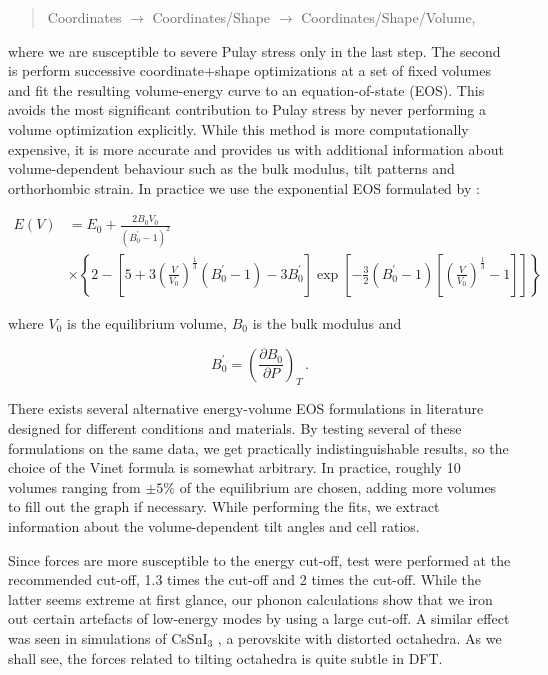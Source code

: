 \begin{quote}
	Coordinates $\rightarrow$ Coordinates/Shape $\rightarrow$ Coordinates/Shape/Volume, 
\end{quote}

\noindent where we are susceptible to severe Pulay stress only in the last step. The second is perform successive coordinate+shape optimizations at a set of fixed volumes and fit the resulting volume-energy curve to an equation-of-state (EOS). This avoids the most significant contribution to Pulay stress by never performing a volume optimization explicitly. While this method is more computationally expensive, it is more accurate and provides us with additional information about volume-dependent behaviour such as the bulk modulus, tilt patterns and orthorhombic strain. In practice we use the exponential EOS formulated by \citeauthor{Vinet1987} \cite{Vinet1987}:

\begin{align*}
E(V) &= E_0 + \frac{2B_0V_0}{\left(B_0^\prime-1\right)^2} \\
&\times \left\lbrace 2 -\left[ 5 + 3\left( \frac{V}{V_0}\right)^\frac{1}{3} (B_0^\prime -1)  -3B_0^\prime \right] \right. \left. \exp \left[ -\frac{3}{2} \left( B_0^\prime-1\right)\left[\left( \frac{V}{V_0}\right)^\frac{1}{3} -1\right]\right]\right\rbrace
\end{align*}

\noindent where $V_0$ is the equilibrium volume, $B_0$ is the bulk modulus and 

\begin{equation*}
B_0^\prime = \left( \frac{\partial B_0}{\partial P}\right)_T \, .
\end{equation*}

\noindent There exists several alternative energy-volume EOS formulations in literature \cite{Murnaghan1944, Birch1947, Poirier1998} designed for different conditions and materials. By testing several of these formulations on the same data, we get practically indistinguishable results, so the choice of the Vinet formula is somewhat arbitrary. In practice, roughly 10 volumes ranging from $\pm 5\%$ of the equilibrium are chosen, adding more volumes to fill out the graph if necessary. While performing the fits, we extract information about the volume-dependent tilt angles and cell ratios.

Since forces are more susceptible to the energy cut-off, test were performed at the recommended cut-off, 1.3 times the cut-off and 2 times the cut-off. While the latter seems extreme at first glance, our phonon calculations show that we iron out certain artefacts of low-energy modes by using a large cut-off. A similar effect was seen in simulations of CsSnI$_3$ \cite{DaSilva2015}, a perovskite with distorted octahedra. As we shall see, the forces related to tilting octahedra is quite subtle in DFT.

